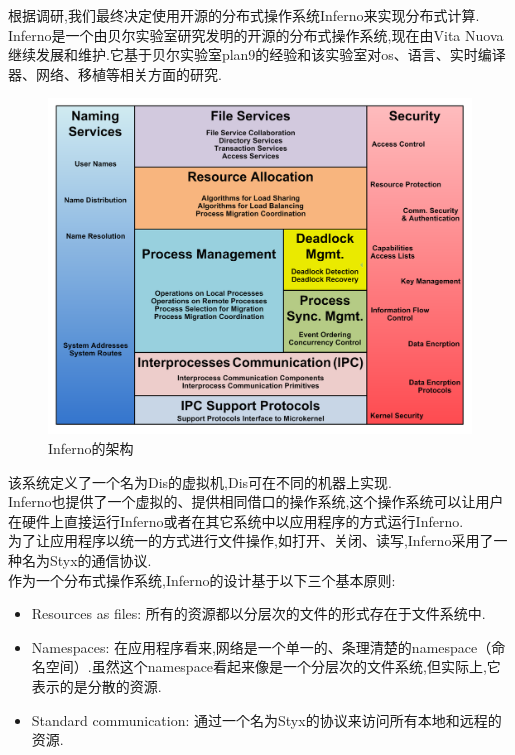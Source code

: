 \documentclass[paper=a4]{ctexart} %
\numberwithin{equation}{section} %
\numberwithin{figure}{section} %
\numberwithin{table}{section} %
\newcommand{\n}{\\\indent}
\begin{document}
根据调研,我们最终决定使用开源的分布式操作系统Inferno来实现分布式计算.\n
Inferno是一个由贝尔实验室研究发明的开源的分布式操作系统,现在由Vita Nuova继续发展和维护.它基于贝尔实验室plan9的经验和该实验室对os、语言、实时编译器、网络、移植等相关方面的研究.\n
\begin{figure}[htbp]
\centering
\includegraphics[width=4.8in,height=3.5in]{pic/2.png}
\caption{Inferno的架构}
\end{figure}
该系统定义了一个名为Dis的虚拟机,Dis可在不同的机器上实现.\n
Inferno也提供了一个虚拟的、提供相同借口的操作系统,这个操作系统可以让用户在硬件上直接运行Inferno或者在其它系统中以应用程序的方式运行Inferno. \n
为了让应用程序以统一的方式进行文件操作,如打开、关闭、读写,Inferno采用了一种名为Styx的通信协议.\n
作为一个分布式操作系统,Inferno的设计基于以下三个基本原则:
\begin{itemize}
\item Resources as files: 所有的资源都以分层次的文件的形式存在于文件系统中.
\item Namespaces: 在应用程序看来,网络是一个单一的、条理清楚的namespace（命名空间）.虽然这个namespace看起来像是一个分层次的文件系统,但实际上,它表示的是分散的资源.
\item Standard communication: 通过一个名为Styx的协议来访问所有本地和远程的资源.
\end{itemize}
\end{document}
